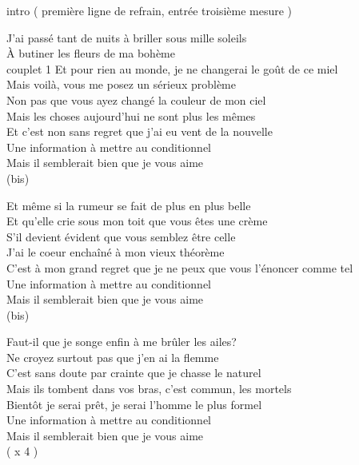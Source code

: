 intro ( première ligne de refrain, entrée troisième mesure )

J'ai passé tant de nuits à briller sous mille soleils \\ 
À butiner les fleurs de ma bohème \\

couplet 1
Et pour rien au monde, je ne changerai le goût de ce miel \\
Mais voilà, vous me posez un sérieux problème \\
Non pas que vous ayez changé la couleur de mon ciel \\
Mais les choses aujourd'hui ne sont plus les mêmes \\
Et c'est non sans regret que j'ai eu vent de la nouvelle \\

Une information à mettre au conditionnel \\
Mais il semblerait bien que je vous aime \\
(bis)


Et même si la rumeur se fait de plus en plus belle \\
Et qu'elle crie sous mon toit que vous êtes une crème \\
S'il devient évident que vous semblez être celle \\
J'ai le coeur enchaîné à mon vieux théorème \\
C'est à mon grand regret que je ne peux que vous l'énoncer comme tel \\

Une information à mettre au conditionnel \\
Mais il semblerait bien que je vous aime \\
(bis)

Faut-il que je songe enfin à me brûler les ailes? \\
Ne croyez surtout pas que j'en ai la flemme \\
C'est sans doute par crainte que je chasse le naturel \\
Mais ils tombent dans vos bras, c'est commun, les mortels \\
Bientôt je serai prêt, je serai l'homme le plus formel \\

Une information à mettre au conditionnel \\ 
Mais il semblerait bien que je vous aime \\
( x 4 )
